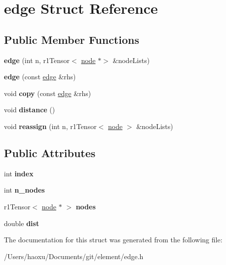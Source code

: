 \hypertarget{structedge}{}\section{edge Struct Reference}
\label{structedge}
\subsection*{Public Member Functions}
\begin{DoxyCompactItemize}
\item 
\mbox{\label{structedge_a4c39c242fee0455dc59703f16e5282a9}} 
{\bfseries edge} (int n, r1\+Tensor$<$ \hyperlink{structnode}{node} $\ast$$>$ \&node\+Lists)
\item 
\mbox{\label{structedge_a624447f195829a42deab34bfd980e99b}} 
{\bfseries edge} (const \hyperlink{structedge}{edge} \&rhs)
\item 
\mbox{\label{structedge_aca7688959137a0e5449b415c0bc156f0}} 
void {\bfseries copy} (const \hyperlink{structedge}{edge} \&rhs)
\item 
\mbox{\label{structedge_a009ea06571de93edd23e27add2bdc277}} 
void {\bfseries distance} ()
\item 
\mbox{\label{structedge_ae75be787e5efdbdfbb29b73a6676ce99}} 
void {\bfseries reassign} (int n, r1\+Tensor$<$ \hyperlink{structnode}{node} $>$ \&node\+Lists)
\end{DoxyCompactItemize}
\subsection*{Public Attributes}
\begin{DoxyCompactItemize}
\item 
\mbox{\label{structedge_a4d9067f195e1b95f485d6658d4797fda}} 
int {\bfseries index}
\item 
\mbox{\label{structedge_a19e3d41eb6833e846f44a01269cc0a8a}} 
int {\bfseries n\+\_\+nodes}
\item 
\mbox{\label{structedge_a64c18e8101ab904712ee054f9815dbf4}} 
r1\+Tensor$<$ \hyperlink{structnode}{node} $\ast$ $>$ {\bfseries nodes}
\item 
\mbox{\label{structedge_aceb28a0abbb66cdd04581b9be2660cca}} 
double {\bfseries dist}
\end{DoxyCompactItemize}


The documentation for this struct was generated from the following file\+:\begin{DoxyCompactItemize}
\item 
/\+Users/haoxu/\+Documents/git/element/edge.\+h\end{DoxyCompactItemize}
